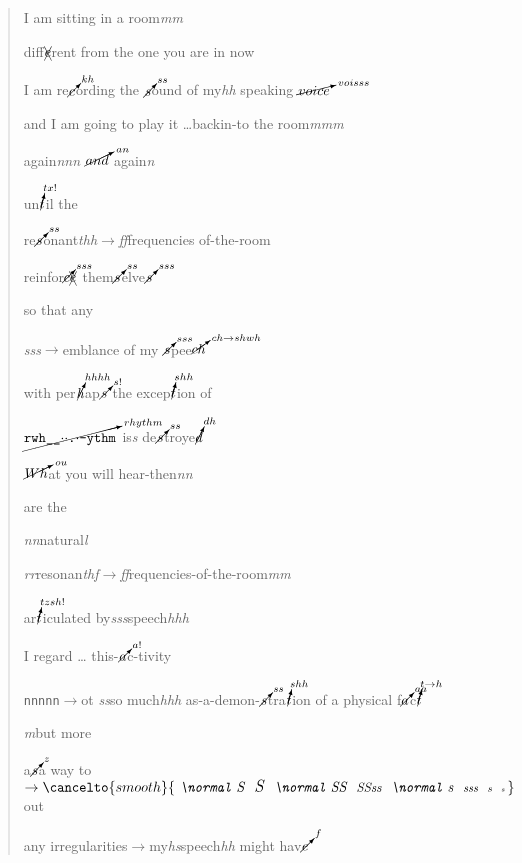 \begin{quote}
\small
I am sitting in a room\textit{mm}\par
diff$\xcancel{e}$rent from the one you are in now\par
{}
I am re$\cancelto{kh}{c}$ording the $\cancelto{ss}{s}$ound of my\textit{hh} speaking $\cancelto{voisss}{voice}$ \par
{}
and I am going to play it \dots backin-to the room\textit{mmm} \par
again\textit{nnn} $\cancelto{an}{and}$  again\textit{n} \par
{}
un$\cancelto{tx!}{t}$il the\par
re$\cancelto{ss}{s}$onant\textit{thh$\rightarrow$ff}frequencies of-the-room\par
{}
reinfor$\cancelto{sss}{c}\xcancel{e}$ them$\cancelto{ss}{s}$elve$\cancelto{sss}{s}$\par
{}
so that any \par
\textit{{\small s}ss}$\rightarrow$emblance of my $\cancelto{sss}{s}$pee$\cancelto{ch\rightarrow shwh}{ch}$\par
{}
with per$\cancelto{hhhh}{h}$ap$\cancelto{s!}{s}$ the excep$\cancelto{shh}{t}$ion of\par
$\cancelto{rhythm}{\texttt{rwh\_\_$\cdot\cdot$.$\cdot$-ythm}}$
is\textit{s} de$\cancelto{ss}{s}$troye$\cancelto{dh}{d}$\par
\par\par
$\cancelto{ou}{Wh}$at you will hear-then\textit{nn} \par
{}
are the\par
\quad \textit{nn}natural\textit{l}\par
\quad \quad \textit{rr}resonan\textit{thf$\rightarrow$ff}requencies-of-the-room\textit{mm}\par
ar$\cancelto{tzsh!}{t}$iculated by\textit{sss}speech\textit{hhh} \par
I regard \dots{} this-$\cancelto{a!}{a}$c-tivity\par
{}
\texttt{nnnnn$\rightarrow$}ot \textit{ss}so much\textit{hhh} as-a-demon-$\cancelto{ss}{s}$tra$\cancelto{shh}{t}$ion of a physical f$\cancelto{aa}{a}$c$\cancelto{t\rightarrow h}{t}$\par
{}
\textit{m}but more\par
{}
a$\cancelto{z}{s}$a way {} to$\rightarrow\cancelto{smooth}{\textit{{ \normal S }{ \large S }{ \normal SS }{ \small SSss }{ \normal s }{ \footnotesize sss  }{ \scriptsize s  }{ \tiny s }}}$ \normal out \par
any irregularities$\rightarrow$my\textit{h}\textit{s}speech\textit{hh} might hav$\cancelto{f}{e}$
\end{quote}



